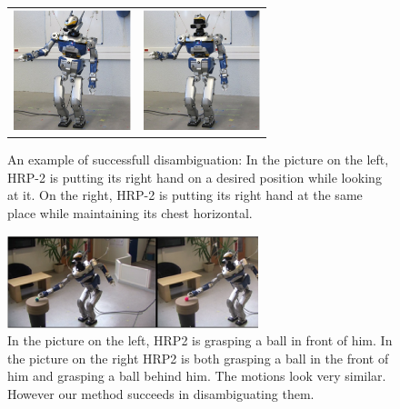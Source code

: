\documentclass[a4paper]{article}
\begin{document}
\vfill
\begin{figure}[h]
  \centering
  \begin{tabular}{cc}
    \includegraphics[width=3.4cm]{img/realRobot/5a/5aFinal1.ps} &
    \includegraphics[width=3.4cm]{img/realRobot/5b/5bFinal1.ps} \\
  \end{tabular}
  \caption{An example of successfull disambiguation: In the picture on the left, HRP-2 is putting its right hand on a 
           desired position while looking at it. On the right, HRP-2 is putting its right hand at the same place while 
           maintaining its chest horizontal.}
  \label{fig:motion5}
\end{figure}
\vfill
\begin{figure}
  \centering
  \includegraphics[height=2.7cm]{img/spotDiff1H.ps}
  \caption{In the picture on the left, HRP2 is grasping a ball in front of him. In the picture on the right HRP2 is both grasping a ball in the front of him and grasping a ball behind him. The motions look very similar. However our method succeeds in disambiguating them.}
  \label{fig:introExample:graspFeet}
\end{figure}
\vfill
\end{document}

